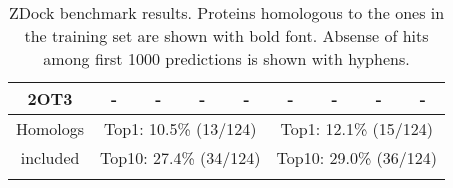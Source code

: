 \begin{longtable}{c c c c c|c c c c}
 {\tiny 2OT3} &{\tiny -}&{\tiny -}&{\tiny -}&{\tiny -} &{\tiny -}&{\tiny -}&{\tiny -}&{\tiny -}\\ 
 \hline
{\tiny Homologs}& \multicolumn{4}{c}{\tiny Top1: 10.5\% (13/124)} & \multicolumn{4}{c}{\tiny Top1: 12.1\% (15/124)}  \\ 
 {\tiny included}& \multicolumn{4}{c}{\tiny Top10: 27.4\% (34/124)} & \multicolumn{4}{c}{\tiny Top10: 29.0\% (36/124)}  \\ 
 \caption[ZDock benchmark results with homologs]{ZDock benchmark results. Proteins homologous to the ones in the training set are shown with bold font. 
Absense of hits among first 1000 predictions is shown with hyphens.}
\label{ZDockTableC} 
 \end{longtable}